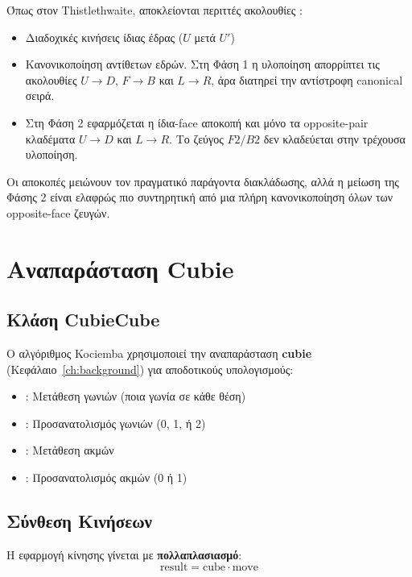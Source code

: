 Όπως στον Thistlethwaite, αποκλείονται περιττές ακολουθίες \cite{kociemba_twophase_details}:
\begin{itemize}
    \item Διαδοχικές κινήσεις ίδιας έδρας ($U$ μετά $U'$)
    \item Κανονικοποίηση αντίθετων εδρών. Στη Φάση 1 η υλοποίηση απορρίπτει τις ακολουθίες $U \to D$, $F \to B$ και $L \to R$, άρα διατηρεί την αντίστροφη canonical σειρά.
    \item Στη Φάση 2 εφαρμόζεται η ίδια-face αποκοπή και μόνο τα opposite-pair κλαδέματα $U \to D$ και $L \to R$. Το ζεύγος $F2/B2$ δεν κλαδεύεται στην τρέχουσα υλοποίηση.
\end{itemize}

Οι αποκοπές μειώνουν τον πραγματικό παράγοντα διακλάδωσης, αλλά η μείωση της
Φάσης 2 είναι ελαφρώς πιο συντηρητική από μια πλήρη κανονικοποίηση όλων των
opposite-face ζευγών.


\section{Αναπαράσταση Cubie}
\label{sec:cubie_repr}

\subsection{Κλάση CubieCube}

Ο αλγόριθμος Kociemba χρησιμοποιεί την αναπαράσταση \textbf{cubie} (Κεφάλαιο~\ref{ch:background}) για αποδοτικούς υπολογισμούς:

\begin{itemize}
    \item {}: Μετάθεση γωνιών (ποια γωνία σε κάθε θέση)
    \item {}: Προσανατολισμός γωνιών (0, 1, ή 2)
    \item {}: Μετάθεση ακμών
    \item {}: Προσανατολισμός ακμών (0 ή 1)
\end{itemize}

\subsection{Σύνθεση Κινήσεων}

Η εφαρμογή κίνησης γίνεται με \textbf{πολλαπλασιασμό}:
\begin{equation}
    \text{result} = \text{cube} \cdot \text{move}
\end{equation}

